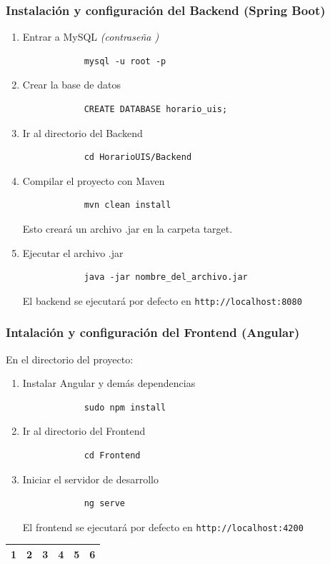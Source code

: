 \documentclass{article} %
\begin{document}
    \subsubsection{Instalación y configuración del Backend (Spring Boot)}
    \begin{enumerate}[font=\bfseries]
        \item Entrar a MySQL \textit{(contraseña \guillemotright)}
        \begin{verbatim}
            mysql -u root -p
        \end{verbatim}
        \item Crear la base de datos
        \begin{verbatim}
            CREATE DATABASE horario_uis;
        \end{verbatim}
        \item Ir al directorio del Backend
        \begin{verbatim}
            cd HorarioUIS/Backend
        \end{verbatim}
        \item Compilar el proyecto con Maven
        \begin{verbatim}
            mvn clean install
        \end{verbatim}
        Esto creará un archivo .jar en la carpeta target.
        \item Ejecutar el archivo .jar
        \begin{verbatim}
            java -jar nombre_del_archivo.jar
        \end{verbatim}
        El backend se ejecutará por defecto en \verb|http://localhost:8080|
    \end{enumerate}

    \subsubsection{Intalación y configuración del Frontend (Angular)}
    \noindent En el directorio del proyecto:
    \begin{enumerate}[font=\bfseries]
        \item Instalar Angular y demás dependencias
        \begin{verbatim}
            sudo npm install
        \end{verbatim}
        \item Ir al directorio del Frontend
        \begin{verbatim}
            cd Frontend
        \end{verbatim}
        \item Iniciar el servidor de desarrollo
        \begin{verbatim}
            ng serve
        \end{verbatim}
        El frontend se ejecutará por defecto en \verb|http://localhost:4200|
    \end{enumerate}
    
\begin{longtable}{|p{1.1cm}|p{2.2cm}|p{1.65cm}|p{1.65cm}|p{3.3cm}|p{3.3cm}|}
    \hline
    1 & 2 & 3 & 4 & 5 & 6\\
    \hline
\end{longtable}
    
\end{document}
